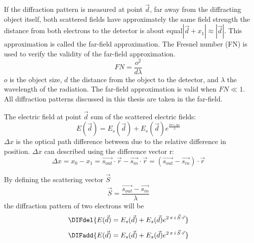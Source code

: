 If the diffraction pattern is measured at point \(\vec{d}\), far away
from the diffracting object itself, both scattered fields have
approximately the same field strength \DIFdelbegin {}\DIFdelend \DIFaddbegin {}\DIFaddend the distance from both
electrons to the detector is about equal\DIFdelbegin \DIFdel{: }\DIFdelend \DIFaddbegin {}\DIFaddend $|\vec{d}+x_1| \approx
|\vec{d}|$. This approximation is called the far-field
approximation. The Fresnel number (FN) is used to verify the validity
of the far-field approximation.
\begin{equation} 
FN = \frac{o^2}{d\lambda}
\end{equation}
\DIFaddbegin {}\DIFaddend $o$ is the object size, $d$ the distance from the object to the
detector, and \(\lambda\) the wavelength of the radiation. The
far-field approximation is valid when $FN \ll 1$. All diffraction
patterns discussed in this thesis are taken in the far-field.

The electric field at point $\vec{d}$ \DIFdelbegin {}\DIFdelend \DIFaddbegin {}\DIFaddend sum of the
\DIFaddbegin {}\DIFaddend scattered electric fields:
\begin{equation}
E(\vec{d}) = E_s(\vec{d})+E_s(\vec{d}) e^{\frac{2 \pi\,i\,\Delta x}{\lambda}} 	 
\end{equation}
$\Delta x$ is the optical path difference between \DIFdelbegin {}\DIFdelend \DIFaddbegin {}\DIFaddend due to the relative difference in position. $\Delta x$ can \DIFdelbegin {}\DIFdelend \DIFaddbegin {}\DIFaddend described using the difference vector r:
\begin{equation}
\Delta x = x_0 - x_1 =\vec{s_{out}} \cdot \vec{r}-\vec{ s_{in}}\cdot \vec{r} = (\vec{s_{out}} -\vec{s_{in}} ) \cdot \vec{r} 
\end{equation}

By defining the scattering vector $\vec{S}$
\begin{equation}
\vec{S} = \frac{\vec{s_{out}}-\vec{s_{in}} }{\lambda}
\end{equation}
the diffraction pattern of two electrons will be 
\DIFdelbegin \DIFdel{:
}\begin{displaymath}
\DIFdel{E(\vec{d}) = E_s(\vec{d}) + E_s(\vec{d}) e^{2\,\pi\,  i\,\vec{S}\cdot\vec{r}}
}\end{displaymath}
\DIFdelend \DIFaddbegin \[\DIFadd{E(\vec{d}) = E_s(\vec{d}) + E_s(\vec{d}) e^{2\,\pi\,  i\,\vec{S}\cdot\vec{r}}}\]

